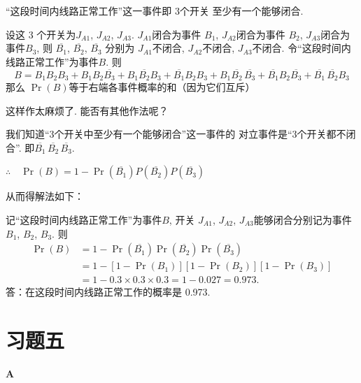 \begin{analyze}
“这段时间内线路正常工作”这一事件即 3个开关
至少有一个能够闭合.

设这 3 个开关为$J_{A1}$, $J_{A2}$, $J_{A3}.$
$J_{A1}$闭合为事件 $B_1$, $J_{A2}$闭合为事件 $B_2$, $J_{A3}$闭合为事件$B_{3}$, 则 $\overline{B_{1}}$, $\overline{B_{2}}$, $\overline{B_{3}}$ 分别为 $J_{A1}$不闭合, $J_{A2}$不闭合, $J_{A3}$不闭合. 令“这段时间内线路正常工作”为事件$B$.
则
$$B=B_{1}B_{2}B_{3}+B_{1}B_{2}\overline{B_{3}}+B_{1}\overline{B_{2}}B_{3}+\overline{B_{1}}B_{2}B_{3}+B_{1}\overline{B_{2}}\,\overline{B_{3}}+\overline{B_1}B_2\overline{B_3}+\overline{B_1}\,\overline{B_2}B_3$$
那么 $\Pr(B)$等于右端各事件概率的和（因为它们互斥）

这样作太麻烦了. 能否有其他作法呢？

我们知道“3个开关中至少有一个能够闭合”这一事件的
对立事件是“3个开关都不闭合”. 即$\overline{B_1}\,\overline{B_2}\,\overline{B_3}$.

$\therefore\quad \Pr( B) = 1- \Pr( \overline {B_{1}}) P( \overline {B_{2}}) P( \overline {B_{3}}) $

从而得解法如下：
\end{analyze}


\begin{solution}
记“这段时间内线路正常工作”为事件$B$, 开关 $J_{A1}$,
$J_{A2}$, $J_{A3}$能够闭合分别记为事件$B_1$, $B_2$, $B_3$. 则
\[\begin{split}
    \Pr(B)&=1-\Pr(\overline{B_1})\Pr(\overline{B_2})\Pr(\overline{B_3})\\
    &=1-[1-\Pr(B_1)][1-\Pr(B_2)][1-\Pr(B_3)]\\
    &=1-0.3\times0.3\times0.3=1-0.027=0.973.
\end{split}\]
答：在这段时间内线路正常工作的概率是 0.973.
\end{solution}


\section*{习题五}
\begin{center}
    \bfseries A
\end{center}

